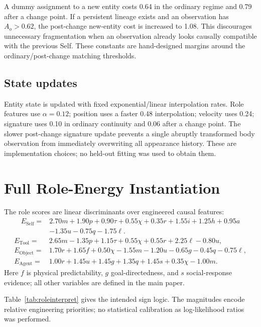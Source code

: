 \documentclass[10pt,journal,onecolumn]{IEEEtran}
\newcommand{\Self}{\mathrm{Self}}
\newcommand{\Tool}{\mathrm{Tool}}
\newcommand{\Object}{\mathrm{Object}}
\newcommand{\Agent}{\mathrm{Agent}}
\begin{document}
A dummy assignment to a new entity costs 0.64 in the ordinary regime and 0.79 after a change point. If a persistent lineage exists and an observation has $A_o>0.62$, the post-change new-entity cost is increased to 1.08. This discourages unnecessary fragmentation when an observation already looks causally compatible with the previous Self. These constants are hand-designed margins around the ordinary/post-change matching thresholds.

\subsection{State updates}
Entity state is updated with fixed exponential/linear interpolation rates. Role features use $\alpha=0.12$; position uses a faster 0.48 interpolation; velocity uses 0.24; signature uses 0.10 in ordinary continuity and 0.06 after a change point. The slower post-change signature update prevents a single abruptly transformed body observation from immediately overwriting all appearance history. These are implementation choices; no held-out fitting was used to obtain them.

\section{Full Role-Energy Instantiation}
The role scores are linear discriminants over engineered causal features:
\begin{equation}
\begin{aligned}
E_{\Self}={}&2.70m+1.90p+0.90\tau+0.55\chi+0.35r+1.55i+1.25h+0.95a\\
&-1.35u-0.75q-1.75\ell.
\end{aligned}
\label{eq:eself}
\end{equation}
\begin{align}
E_{\Tool}={}&2.65m-1.35p+1.15\tau+0.55\chi+0.55r+2.25\ell-0.80u,\label{eq:etool}\\
E_{\Object}={}&1.70r+1.65f+0.50\chi-1.55m-1.20u-0.65g-0.45q-0.75\ell,\label{eq:eobj}\\
E_{\Agent}={}&1.00r+1.45u+1.45g+1.35q+1.45s+0.35\chi-1.00m.\label{eq:eagent}
\end{align}
Here $f$ is physical predictability, $g$ goal-directedness, and $s$ social-response evidence; all other variables are defined in the main paper.

Table~\ref{tab:roleinterpret} gives the intended sign logic. The magnitudes encode relative engineering priorities; no statistical calibration as log-likelihood ratios was performed.
\end{document}
